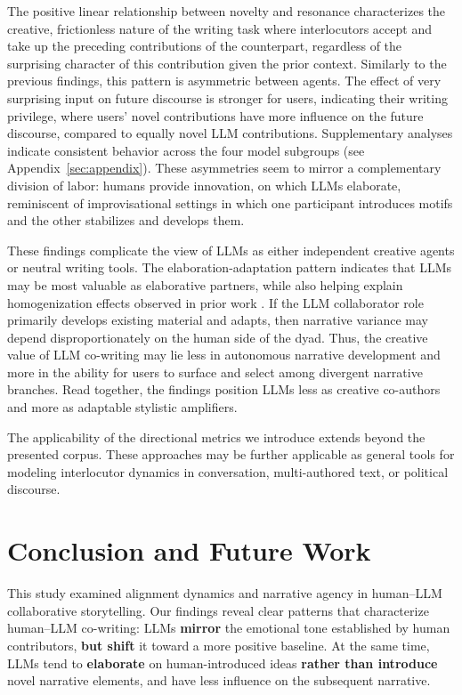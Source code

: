 \documentclass[11pt]{article}
\begin{document}
The positive linear relationship between novelty and resonance characterizes the creative, frictionless nature of the writing task where interlocutors accept and take up the preceding contributions of the counterpart, regardless of the surprising character of this contribution given the prior context. Similarly to the previous findings, this pattern is asymmetric between agents. The effect of very surprising input on future discourse is stronger for users, indicating their writing privilege, where users' novel contributions have more influence on the future discourse, compared to equally novel LLM contributions. Supplementary analyses indicate consistent behavior across the four model subgroups (see Appendix~\ref{sec:appendix}).
These asymmetries seem to mirror a complementary division of labor: humans provide innovation, on which LLMs elaborate, reminiscent of improvisational settings in which one participant introduces motifs and the other stabilizes and develops them.%

These findings complicate the view of LLMs as either independent creative agents or neutral writing tools. The elaboration-adaptation pattern indicates that LLMs may be most valuable as elaborative partners, while also helping explain homogenization effects observed in prior work \cite{anderson2024homogenization}. If the LLM collaborator role primarily develops existing material and adapts, then narrative variance may depend disproportionately on the human side of the dyad. Thus, the creative value of LLM co-writing may lie less in autonomous narrative development and more in the ability for users to surface and select among divergent narrative branches. Read together, the findings position LLMs less as creative co-authors and more as adaptable stylistic amplifiers.

The applicability of the directional metrics we introduce extends beyond the presented corpus. These approaches may be further applicable as general tools for modeling interlocutor dynamics in conversation, multi-authored text, or political discourse. 

\section{Conclusion and Future Work}
This study examined alignment dynamics and narrative agency in human–LLM collaborative storytelling. Our findings reveal clear patterns that characterize human–LLM co-writing: LLMs \textbf{mirror} the emotional tone established by human contributors, \textbf{but shift} it toward a more positive baseline. At the same time, LLMs tend to \textbf{elaborate} on human-introduced ideas \textbf{rather than introduce} novel narrative elements, and have less influence on the subsequent narrative.
\end{document}
